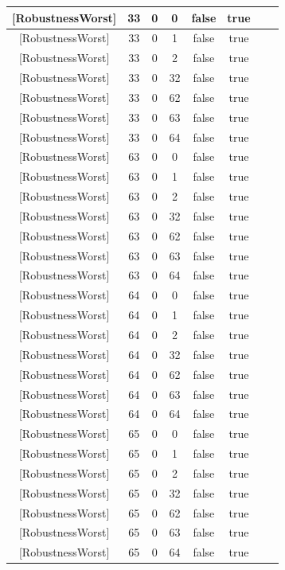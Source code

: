 \documentclass[a4paper,9pt,oneside]{scrreprt}
\begin{document}
\begin{enumerate}[a)]
\begin{paracol}{2}
\begin{table}[H]
{\begin{tabular}{|c|c|c|c|c|c|c|c|}
						\hline
						{[}RobustnessWorst{]}&33&0&0&false&true\\
						\hline
						{[}RobustnessWorst{]}&33&0&1&false&true\\
						\hline
						{[}RobustnessWorst{]}&33&0&2&false&true\\
						\hline
						{[}RobustnessWorst{]}&33&0&32&false&true\\
						\hline
						{[}RobustnessWorst{]}&33&0&62&false&true\\
						\hline
						{[}RobustnessWorst{]}&33&0&63&false&true\\
						\hline
						{[}RobustnessWorst{]}&33&0&64&false&true\\
						\hline
						{[}RobustnessWorst{]}&63&0&0&false&true\\
						\hline
						{[}RobustnessWorst{]}&63&0&1&false&true\\
						\hline
						{[}RobustnessWorst{]}&63&0&2&false&true\\
						\hline
						{[}RobustnessWorst{]}&63&0&32&false&true\\
						\hline
						{[}RobustnessWorst{]}&63&0&62&false&true\\
						\hline
						{[}RobustnessWorst{]}&63&0&63&false&true\\
						\hline
						{[}RobustnessWorst{]}&63&0&64&false&true\\
						\hline
						{[}RobustnessWorst{]}&64&0&0&false&true\\
						\hline
						{[}RobustnessWorst{]}&64&0&1&false&true\\
						\hline
						{[}RobustnessWorst{]}&64&0&2&false&true\\
						\hline
						{[}RobustnessWorst{]}&64&0&32&false&true\\
						\hline
						{[}RobustnessWorst{]}&64&0&62&false&true\\
						\hline
						{[}RobustnessWorst{]}&64&0&63&false&true\\
						\hline
						{[}RobustnessWorst{]}&64&0&64&false&true\\
						\hline
						{[}RobustnessWorst{]}&65&0&0&false&true\\
						\hline
						{[}RobustnessWorst{]}&65&0&1&false&true\\
						\hline
						{[}RobustnessWorst{]}&65&0&2&false&true\\
						\hline
						{[}RobustnessWorst{]}&65&0&32&false&true\\
						\hline
						{[}RobustnessWorst{]}&65&0&62&false&true\\
						\hline
						{[}RobustnessWorst{]}&65&0&63&false&true\\
						\hline
						{[}RobustnessWorst{]}&65&0&64&false&true\\
						\hline
					\end{tabular}
					\bigskip
				}
			\end{table}
		

\end{paracol}
\end{enumerate}
\end{document}
